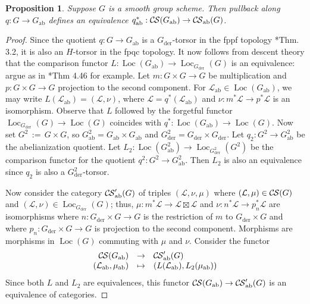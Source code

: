 \documentclass[10pt]{amsart}
\theoremstyle{plain}
\newtheorem{proposition}[theorem]{Proposition}
\theoremstyle{definition}
\DeclareMathOperator{\Loc}{Loc}
\newcommand{\der}{_{\operatorname{der}}}
\newcommand{\ab}{_{\operatorname{ab}}}
\newcommand{\ceq}{{\, :=\, }}
\newcommand{\cs}[1]{{\mathcal{#1}}}
\newcommand{\CS}{{\mathcal{C\hskip-0.8pt S}}}
\newcommand{\CSab}{\CS_{\operatorname{ab}}}
\begin{document}

\begin{proposition} \label{prop:CSGabab}
Suppose $G$ is a smooth group scheme.  
Then pullback along $q : G \to G\ab$ defines an equivalence $q\ab^*: \CS(G\ab) \to \CSab(G)$.
\end{proposition}
\begin{proof}
Since the quotient $q : G \to G\ab$ is a $G\der$-torsor in the fppf topology \cite{demazure:SGA3-VIA}*{Thm. 3.2}, 
it is also an $H$-torsor in the fpqc topology.  
It now follows from descent theory that the comparison functor $L : \Loc(G\ab) \to \Loc_{G\der}(G)$ is an equivalence: argue as in \cite{Vistoli:notes}*{Thm 4.46} for example. \todo{Haven't defined $\Loc$ and $\Loc_{G\der}$}
Let $m : G\times G\to G$ be multiplication and $p : G\times G \to G$ projection to the second component.  For $\cs{L}\ab\in \Loc(G\ab)$, we may write $L(\cs{L}\ab) = (\cs{L}, \nu)$, where $\cs{L} = q^*(\cs{L}\ab)$ and $\nu : m^*\cs{L}  \to p^*\cs{L}$ is an isomorphism. 
Observe that $L$ followed by the forgetful functor $\Loc_{G\der}(G)\to \Loc(G)$ coincides with $q^*: \Loc(G\ab)\to \Loc(G)$. 
%
Now set $G^2 \ceq G\times G$, so $G^2\ab =  G\ab \times G\ab$ and $G^2\der = G\der \times G\der$. Let $q_2 : G^2 \to G^2\ab$ be the abelianization quotient.  
Let $L_2 : \Loc(G^2\ab) \to \Loc_{G^2\der}(G^2)$ be the comparison functor for the quotient $q^2  : G^2 \to G^2\ab$.
Then $L_2$ is also an equivalence since $q_2$ is also a $G^2\der$-torsor.

Now consider the category $\CSab'(G)$ of triples $(\cs{L},\nu,\mu)$ where $(\cs{L},\mu)\in \CS(G)$ and $(\cs{L},\nu)\in \Loc_{G\der}(G)$; thus, $\mu : m^*\cs{L} \to \cs{L}\boxtimes\cs{L}$ and $\nu :  n^*\cs{L} \to p_n^*\cs{L}$ are isomorphisms where $n : G\der\times G\to G$ is the restriction of $m$ to $G\der\times G$ and where $p_n : G\der\times G\to G$ is projection to the second component. 
Morphisms are morphisms in $\Loc(G)$ commuting with $\mu$ and $\nu$.  
Consider the functor
\[
\begin{array}{rcl}
\CS(G\ab) &\to& \CSab'(G) \\
(\cs{L}\ab,\mu\ab) &\mapsto& (L(\cs{L}\ab), L_2(\mu\ab))
\end{array}
\]
Since both $L$ and $L_2$ are equivalences, this functor $\CS(G\ab) \to \CSab'(G)$ is an equivalence of categories.


\end{proof}
\end{document}
